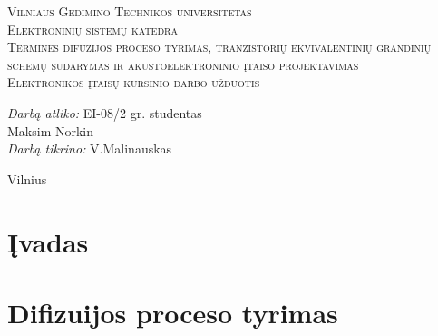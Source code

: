 \documentclass[11pt,a4paper]{article}
\begin{document}
\begin{titlepage}
  
  \begin{center}
    \textsc{\LARGE Vilniaus Gedimino Technikos universitetas}\\[2mm]
    \textsc{\Large Elektroninių sistemų katedra}\\[70mm]
    \textsc{\Large Terminės difuzijos proceso tyrimas, tranzistorių ekvivalentinių grandinių schemų sudarymas ir akustoelektroninio įtaiso projektavimas}\\[10mm]
    \textsc{\normalsize Elektronikos įtaisų kursinio darbo užduotis}\\[40mm]
    \begin{minipage}{1\textwidth}
      \begin{flushright}
        \emph{Darbą atliko:} EI-08/2 gr. studentas\\ Maksim Norkin\\
        \emph{Darbą tikrino:} V.Malinauskas\\
      \end{flushright}
    \end{minipage}
    \vfill
    {\large Vilnius \\ \the\year}
  \end{center}
\end{titlepage}
\tableofcontents
\newpage
\section{Įvadas}
\section{Difizuijos proceso tyrimas}
\end{document}
